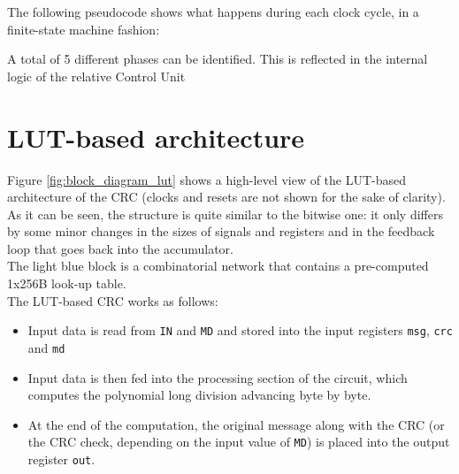 The following pseudocode shows what happens during each clock cycle, in a finite-state machine fashion:
\hfill \break

\lstset{style=codestyle}\label{code:FSM_bitwise}

\hfill \break
A total of 5 different phases can be identified. This is reflected in the internal logic of the relative Control Unit\\

\section{LUT-based architecture}\label{sec:LUT_arch}


Figure \ref{fig:block_diagram_lut} shows a high-level view of the LUT-based architecture of the CRC (clocks and resets are not shown for the sake of clarity).\\
As it can be seen, the structure is quite similar to the bitwise one: it only differs by some minor changes in the sizes of signals and registers and in the feedback loop that goes back into the accumulator.\\
The light blue block is a combinatorial network that contains a pre-computed 1x256B look-up table.\\
\hfill \break
The LUT-based CRC works as follows:\\
\begin{itemize}
	\item Input data is read from \texttt{IN} and \texttt{MD} and stored into the input registers \texttt{msg}, \texttt{crc} and \texttt{md}
	\item Input data is then fed into the processing section of the circuit, which computes the polynomial long division advancing byte by byte.
	\item At the end of the computation, the original message along with the CRC (or the CRC check, depending on the input value of \texttt{MD}) is placed into the output register \texttt{out}.
\end{itemize}

